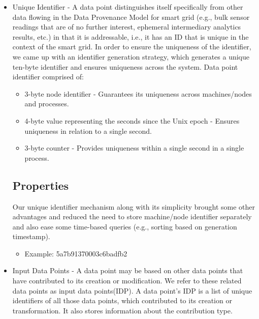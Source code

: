 \begin{itemize}
	\item Unique Identifier - A data point distinguishes itself specifically from other data flowing in the Data Provenance Model for smart grid  (e.g., bulk sensor readings that are of no further interest, ephemeral intermediary analytics results, etc.) in that it is addressable, i.e., it has an ID that is unique in the context of the smart grid. In order to ensure the uniqueness of the identifier, we came up with an identifier generation strategy, which generates a unique ten-byte identifier and ensures uniqueness across the system. Data point identifier comprised of:
		\begin{itemize}
			\item 3-byte node identifier - Guarantees its uniqueness across machines/nodes and processes.
			\item 4-byte value representing the seconds since the Unix epoch - Ensures uniqueness in relation to a single second.
			\item 3-byte counter - Provides uniqueness within a single second in a single process.
		\end{itemize}
		\subsection* {Properties} Our unique identifier mechanism along with its simplicity brought some other advantages and reduced the need to store machine/node identifier separately and also ease some time-based queries (e.g., sorting based on generation timestamp).
			\begin{itemize}				
				\item Example: 5a7b91370003c6badfb2
			\end{itemize}
	\item Input Data Points - A data point may be based on other data points that have contributed to its creation or modification. We refer to these related
data points as input data points(IDP). A data point's IDP is a list of unique identifiers of all those data points, which contributed to its creation or transformation. It also stores information about the contribution type.
	

\end{itemize}
